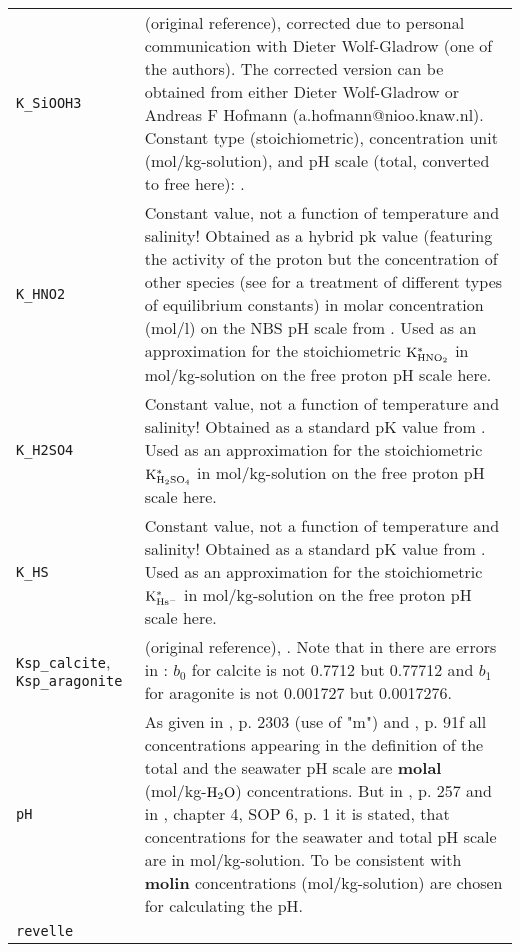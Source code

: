\documentclass[article,nojss]{jss}
\begin{document}
\begin{footnotesize}
\begin{longtable}{p{}|p{}}
\texttt{K\_SiOOH3}   & \citet{Wischmeyer2003} (original reference), corrected due to personal communication with Dieter Wolf-Gladrow (one of the authors). The corrected version can be obtained from either Dieter Wolf-Gladrow or Andreas F Hofmann 
(a.hofmann@nioo.knaw.nl).  Constant type (stoichiometric), concentration unit (mol/kg-solution), and pH scale (total, converted to free here): \citet{Wischmeyer2003}.\\
\texttt{K\_HNO2}     & Constant value, not a function of temperature and salinity! Obtained as a hybrid pk value (featuring the activity of the proton but the concentration of other species (see \citet{Zeebe2001} for a treatment of different types of
equilibrium constants) in molar concentration (mol/l) on the NBS pH scale \citep{Durst1975} from \citet{Riordan2005}. Used as an approximation for the stoichiometric $\rm K^*_{\rm HNO_2}$ in mol/kg-solution on the free proton pH scale here.\\
\texttt{K\_H2SO4}    & Constant value, not a function of temperature and salinity! Obtained as a standard pK value from \citet[p. 1045]{Atkins1996}. Used as an approximation for the stoichiometric $\rm K^*_{\rm H_2SO_4}$ in mol/kg-solution on the free proton pH scale here.\\
\texttt{K\_HS}       & Constant value, not a function of temperature and salinity! Obtained as a standard pK value from \citet[p. 1045]{Atkins1996}. Used as an approximation for the stoichiometric $\rm K^*_{\rm Hs^-}$ in mol/kg-solution on the free proton pH scale here.\\
\texttt{Ksp\_calcite}, \texttt{Ksp\_aragonite}  & \citet{Mucci1983} (original reference), \citet{Boudreau1996}. Note that in there are errors in \citet{Boudreau1996}: $b_0$ for calcite is not 0.7712 but 0.77712 and $b_1$ for 
aragonite is not 0.001727 but 0.0017276.\\
\texttt{pH}  & As given in \citet{Dickson1984}, p. 2303 (use of "m") and \citet{Dickson1979a}, p. 91f all concentrations appearing in the definition 
of the total and the seawater pH scale are \textbf{molal} (mol/kg-$\rm H_2O$) concentrations. But in \citet{Roy1993b}, p. 257  and in \citet{DOE1994}, 
chapter 4, SOP 6, p. 1 it is stated, that concentrations for the seawater and total pH scale are in mol/kg-solution.
To be consistent with \citet{DOE1994} \textbf{molin} concentrations (mol/kg-solution) are chosen for calculating the pH.\\
\texttt{revelle}     & \citet[p.73]{Zeebe2001}\\   

\end{longtable}
\end{footnotesize}
\end{document}

